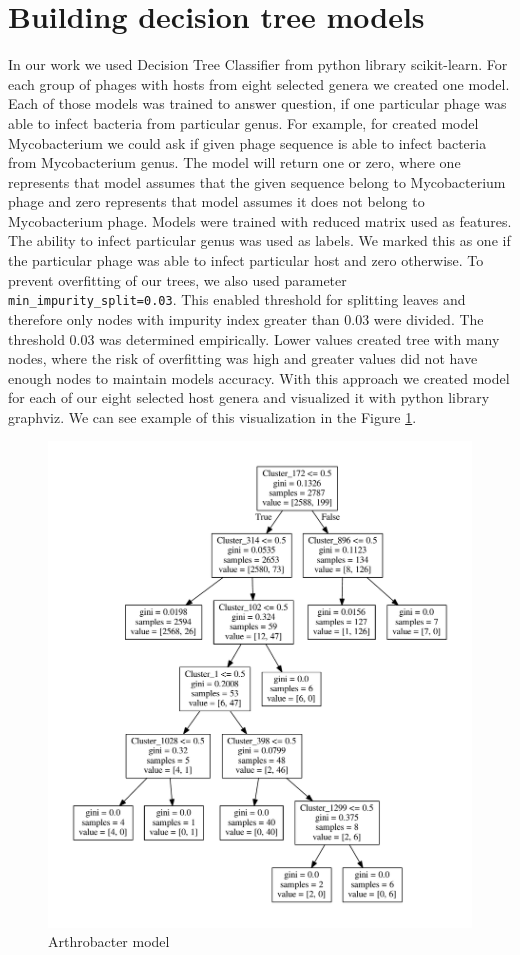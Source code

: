 \section{Building decision tree models}
In our work we used Decision Tree Classifier from python library scikit-learn.
For each group of phages with hosts from eight selected genera we created one model.
Each of those models was trained to answer question, if one particular phage was able to infect bacteria from particular genus.
For example, for created model Mycobacterium we could ask if given phage sequence is able to infect bacteria from Mycobacterium genus.
The model will return one or zero, where one represents that model assumes that the given sequence belong to Mycobacterium phage and zero represents that model assumes it does not belong to Mycobacterium phage.
Models were trained with reduced matrix used as features.
The ability to infect particular genus was used as labels.
We marked this as one if the particular phage was able to infect particular host and zero otherwise.
To prevent overfitting of our trees, we also used parameter \verb|min_impurity_split=0.03|.
This enabled threshold for splitting leaves and therefore only nodes with impurity index greater than 0.03 were divided.
The threshold 0.03 was determined empirically.
Lower values created tree with many nodes, where the risk of overfitting was high and greater values did not have enough nodes to maintain models accuracy.
With this approach we created model for each of our eight selected host genera and visualized it with python library graphviz.
We can see example of this visualization in the Figure \ref{fig:tree}.

\begin{figure}[htp]
\includegraphics[width=\linewidth]{./images/tree.pdf}
\centering
\caption{Arthrobacter model}
\label{fig:tree}
\end{figure}


